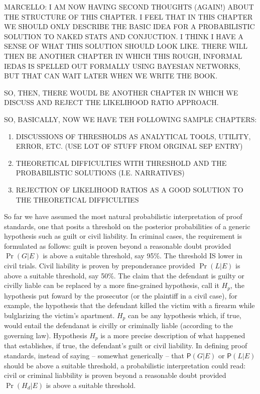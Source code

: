 \documentclass[10pt,dvipsnames,enabledeprecatedfontcommands]{scrartcl}
\newcommand{\pr}[1]{\mathsf{P}(#1)}
\begin{document}
MARCELLO: I AM NOW HAVING SECOND THOUGHTS (AGAIN!) ABOUT THE STRUCTURE
OF THIS CHAPTER. I FEEL THAT IN THIS CHAPTER WE SHOULD ONLY DESCRIBE THE
BASIC IDEA FOR A PROBABILISTIC SOLUTION TO NAKED STATS AND CONJUCTION. I
THINK I HAVE A SENSE OF WHAT THIS SOLUTION SHOULD LOOK LIKE. THERE WILL
THEN BE ANOTHER CHAPTER IN WHICH THIS ROUGH, INFORMAL IEDAS IS SPELLED
OUT FORMALLY USING BAYESIAN NETWORKS, BUT THAT CAN WAIT LATER WHEN WE
WRITE THE BOOK.

SO, THEN, THERE WOUDL BE ANOTHER CHAPTER IN WHICH WE DISCUSS AND REJECT
THE LIKELIHOOD RATIO APPROACH.

SO, BASICALLY, NOW WE HAVE TEH FOLLOWING SAMPLE CHAPTERS:

\begin{enumerate}
\def\labelenumi{\arabic{enumi}.}
\item
  DISCUSSIONS OF THRESHOLDS AS ANALYTICAL TOOLS, UTILITY, ERROR, ETC.
  (USE LOT OF STUFF FROM ORGINAL SEP ENTRY)
\item
  THEORETICAL DIFFICULTIES WITH THRESHOLD AND THE PROBABILISTIC
  SOLUTIONS (I.E. NARRATIVES)
\item
  REJECTION OF LIKELIHOOD RATIOS AS A GOOD SOLUTION TO THE THEORETICAL
  DIFFICULTIES
\end{enumerate}

So far we have assumed the most natural probabilistic interpretation of
proof standards, one that posits a threshold on the posterior
probabilities of a generic hypothesis such as guilt or civil liability.
In criminal cases, the requirement is formulated as follows: guilt is
proven beyond a reasonable doubt provided \(\Pr(G | E)\) is above a
suitable threshold, say 95\%. The threshold IS lower in civil trials.
Civil liability is proven by preponderance provided \(\Pr(L | E)\) is
above a suitable threshold, say 50\%. The claim that the defendant is
guilty or civilly liable can be replaced by a more fine-grained
hypothesis, call it \(H_p\), the hypothesis put foward by the prosecutor
(or the plaintiff in a civil case), for example, the hypothesis that the
defendant killed the victim with a firearm while bulglarizing the
victim's apartment. \(H_p\) can be any hypothesis which, if true, would
entail the defendanat is civilly or criminally liable (according to the
governing law). Hypothesis \(H_p\) is a more precise description of what
happened that establishes, if true, the defendant's guilt or civil
liability. In defining proof standards, instead of saying -- somewhat
generically -- that \(\pr{G | E}\) or \(\pr{L | E}\) should be above a
suitable threshold, a probabilistic interpretation could read: civil or
criminal liabbility is proven beyond a reasonable doubt provided
\(\Pr(H_d | E)\) is above a suitable threshold.
\end{document}
